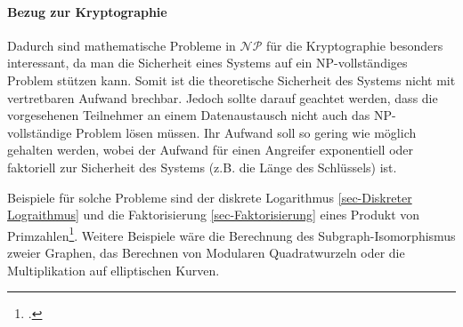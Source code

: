     \paragraph{Bezug zur Kryptographie} Dadurch sind mathematische Probleme in $\mathcal{NP}$ für die Kryptographie besonders interessant, da man die Sicherheit eines Systems auf ein NP-vollständiges Problem stützen kann. Somit ist die theoretische Sicherheit des Systems nicht mit vertretbaren Aufwand  brechbar. Jedoch sollte darauf geachtet werden, dass die vorgesehenen Teilnehmer an einem Datenaustausch nicht auch das NP-vollständige Problem lösen müssen. Ihr Aufwand soll so gering wie möglich gehalten werden, wobei der Aufwand für einen Angreifer exponentiell oder faktoriell zur Sicherheit des Systems (z.B. die Länge des Schlüssels) ist. 

    Beispiele für solche Probleme sind der diskrete Logarithmus \ref{sec-Diskreter Lograithmus} und die Faktorisierung \ref{sec-Faktorisierung} eines Produkt von Primzahlen\footcite[179]{BSW.2015}. Weitere Beispiele wäre die Berechnung des Subgraph-Isomorphismus zweier Graphen, das Berechnen von Modularen Quadratwurzeln oder die Multiplikation auf elliptischen Kurven.

